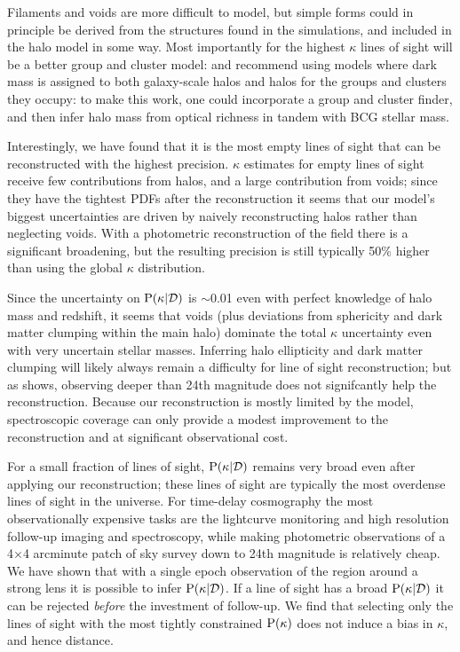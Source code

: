 \documentclass[useAMS,usenatbib]{mn2e}
\begin{document}
Filaments and voids are more difficult to model, but simple forms could in
principle be derived from the structures found in the simulations, and
included in the halo model in some way. Most importantly for the highest
$\kappa$ lines of sight will be a better group and cluster model:
\citet{MomchevaEtal2006} and  \citet{WongEtal2011} recommend using models
where dark mass is assigned to both galaxy-scale halos and halos for the
groups and clusters they occupy: to make this work, one could incorporate  a
group and cluster finder, and then infer halo mass from optical richness
\citep[\eg][]{MaxBCG} in tandem with BCG stellar mass.



Interestingly, we have found that it is the most empty lines of sight that 
can be reconstructed with the highest precision. $\kappa$ estimates for empty
lines of sight receive few contributions from halos, and a large contribution
from voids; since they have the tightest PDFs after the reconstruction it
seems that our model's biggest uncertainties are driven by naively
reconstructing halos rather than neglecting voids. With a photometric
reconstruction of the field there is a significant broadening, but the
resulting precision is still typically 50\%  higher than using the global
$\kappa$ distribution. 

Since the uncertainty on ${\rm P}(\kappa|{\mathcal{D}})$ is $\sim$0.01 even
with perfect knowledge of halo mass and redshift, it seems that voids
(plus deviations from sphericity and dark matter clumping within the
main halo) dominate the total $\kappa$ uncertainty even with very
uncertain stellar masses. Inferring halo ellipticity and dark matter
clumping will likely always remain a difficulty for line of sight
reconstruction; but as  shows, observing deeper
than 24th magnitude does not signifcantly help the reconstruction.
Because our reconstruction is mostly limited by the model, spectroscopic
coverage can only provide a modest improvement to the reconstruction and
at significant observational cost.

For a small fraction of lines of sight, ${\rm P}(\kappa|{\mathcal{D}})$ remains very
broad even after applying our reconstruction; these lines of sight are
typically the most overdense lines of sight in the universe. For
time-delay cosmography the most observationally expensive tasks are the
lightcurve monitoring and high resolution follow-up imaging and spectroscopy,
while making photometric observations of a
4$\times$4 arcminute patch of sky survey down to 24th magnitude is
relatively cheap. We have shown that with a single epoch observation of
the region around a strong lens it is possible to infer ${\rm P}(\kappa|{\mathcal{D}})$.
If a line of sight has a broad ${\rm P}(\kappa|{\mathcal{D}})$ it can be rejected {\it
before} the investment of follow-up. We find that
selecting only the lines of sight with the most tightly constrained
${\rm P}(\kappa)$ does not induce a bias in $\kappa$, and hence distance.
\end{document}
